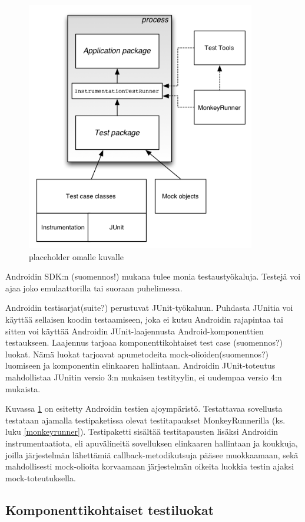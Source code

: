 \begin{figure}[htb]
\includegraphics[width=100mm]{test_framework.png}
\caption{placeholder omalle kuvalle} \label{test_framework}
\end{figure}

Androidin SDK:n (suomennos!) mukana tulee monia testaustyökaluja. Testejä voi ajaa joko emulaattorilla tai suoraan puhelimessa.

Androidin testisarjat(suite?) perustuvat JUnit-työkaluun. Puhdasta JUnitia voi käyttää sellaisen koodin testaamiseen, joka ei kutsu Androidin rajapintaa tai sitten voi käyttää Androidin JUnit-laajennusta Android-komponenttien testaukseen. Laajennus tarjoaa komponenttikohtaiset test case (suomennos?) luokat. Nämä luokat tarjoavat apumetodeita mock-olioiden(suomennos?) luomiseen ja komponentin elinkaaren hallintaan. Androidin JUnit-toteutus mahdollistaa JUnitin versio 3:n mukaisen testityylin, ei uudempaa versio 4:n mukaista.

Kuvassa \ref{test_framework} on esitetty Androidin testien ajoympäristö. Testattavaa sovellusta testataan ajamalla testipaketissa olevat testitapaukset MonkeyRunnerilla (ks. luku \ref{monkeyrunner}). Testipaketti sisältää testitapausten lisäksi Androidin instrumentaatiota, eli apuvälineitä sovelluksen elinkaaren hallintaan ja koukkuja, joilla järjestelmän lähettämiä callback-metodikutsuja pääsee muokkaamaan, sekä mahdollisesti mock-olioita korvaamaan järjestelmän oikeita luokkia testin ajaksi mock-toteutuksella. \cite{android}

\subsection{Komponenttikohtaiset testiluokat}

